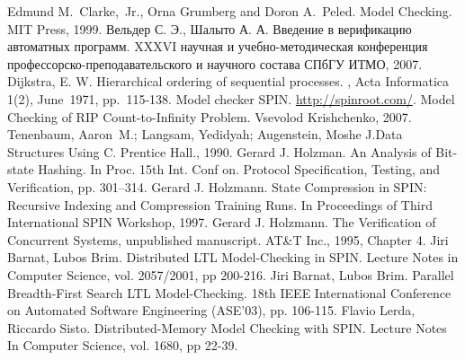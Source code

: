 \begin{thebibliography}{99}

 Edmund M.~Clarke,~Jr., Orna Grumberg and Doron A.~Peled. Model
  Checking. MIT Press, 1999.
 Вельдер С. Э., Шалыто А. А. Введение в верификацию автоматных
  программ. XXXVI научная и учебно-методическая конференция
  профессорско-преподавательского и научного состава СПбГУ ИТМО, 2007.
 Dijkstra, E. W. Hierarchical ordering of sequential processes. , Acta
  Informatica 1(2), June~1971, pp.~115-138.
 Model checker SPIN. \url{http://spinroot.com/}.
 Model Checking of RIP Count-to-Infinity Problem. Vsevolod Krishchenko,
  2007.
 Tenenbaum, Aaron~M.; Langsam, Yedidyah; Augenstein, Moshe J.Data
  Structures Using C. Prentice Hall., 1990.
 Gerard J. Holzman. An Analysis of Bit-state
  Hashing. In Proc. 15th Int. Conf on. Protocol Specification,
  Testing, and Verification, pp. 301–314.
 Gerard J. Holzmann. State Compression in SPIN: Recursive
  Indexing and Compression Training Runs. In Proceedings of Third International
  SPIN Workshop, 1997.
 Gerard J. Holzmann. The Verification of Concurrent Systems,
  unpublished manuscript. AT\&T Inc., 1995, Chapter 4.
 Jiri Barnat, Lubos Brim. Distributed LTL
  Model-Checking in SPIN. Lecture Notes in Computer Science,
  vol. 2057/2001, pp 200-216.
 Jiri Barnat, Lubos Brim. Parallel Breadth-First Search
  LTL Model-Checking. 18th IEEE International Conference on Automated
  Software Engineering (ASE'03), pp. 106-115.
 Flavio Lerda, Riccardo Sisto. Distributed-Memory Model
  Checking with SPIN. Lecture Notes In Computer Science, vol. 1680, pp
  22-39.
\end{thebibliography}


